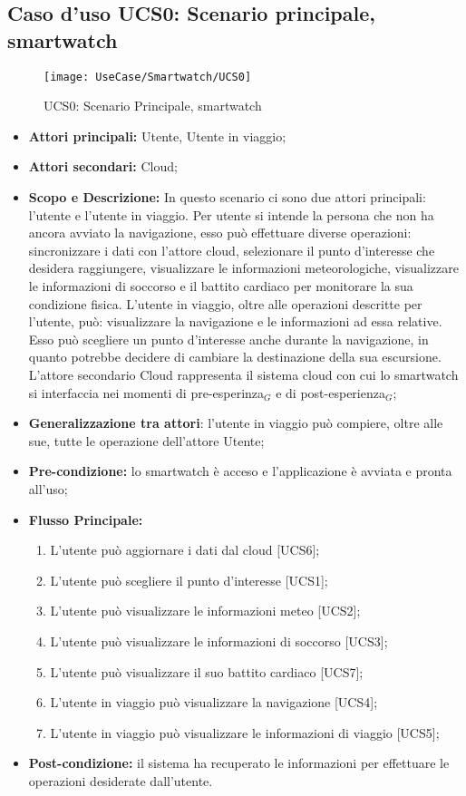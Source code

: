 \subsection{Caso d'uso UCS0: Scenario principale, smartwatch}


\begin{figure}[H]
\centering
\texttt{[image: UseCase/Smartwatch/UCS0]}
\caption{UCS0: Scenario Principale, smartwatch}
\end{figure}

\begin{itemize}
\item \textbf{Attori principali:} Utente, Utente in viaggio;
\item \textbf{Attori secondari:} Cloud;
\item \textbf{Scopo e Descrizione:} In questo scenario ci sono due attori principali: l'utente e l'utente in viaggio. Per utente si intende la persona che non ha ancora avviato la navigazione, esso può effettuare diverse operazioni: sincronizzare i dati con l'attore cloud, selezionare il punto d'interesse che desidera raggiungere, visualizzare le informazioni meteorologiche, visualizzare le informazioni di soccorso e il battito cardiaco per monitorare la sua condizione fisica. L'utente in viaggio, oltre alle operazioni descritte per l'utente, può: visualizzare la navigazione e le informazioni ad essa relative. Esso può scegliere un punto d'interesse anche durante la navigazione, in quanto potrebbe decidere di cambiare la destinazione della sua escursione. L'attore secondario Cloud rappresenta il sistema cloud con cui lo smartwatch si interfaccia nei momenti di pre-esperinza$_{G}$ e di post-esperienza$_{G}$;
\item \textbf{Generalizzazione tra attori}: l'utente in viaggio può compiere, oltre alle sue, tutte le operazione dell'attore Utente;
\item \textbf{Pre-condizione:} lo smartwatch è acceso e l'applicazione è avviata e pronta all'uso;
\item \textbf{Flusso Principale:}
\begin{enumerate}
\item L'utente può aggiornare i dati dal cloud [UCS6];
\item L'utente può scegliere il punto d'interesse [UCS1];
\item L'utente può visualizzare le informazioni meteo [UCS2];
\item L'utente può visualizzare le informazioni di soccorso [UCS3];
\item L'utente può visualizzare il suo battito cardiaco [UCS7];
\item L'utente in viaggio può visualizzare la navigazione [UCS4];
\item L'utente in viaggio può visualizzare le informazioni di viaggio [UCS5];
\end{enumerate}
\item \textbf{Post-condizione:} il sistema ha recuperato le informazioni per effettuare le operazioni desiderate dall'utente.
\end{itemize}

